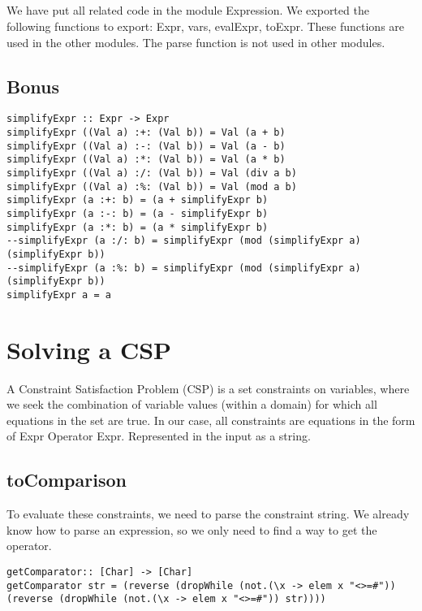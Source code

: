 \documentclass[a4paper,11pt]{article}
\begin{document}
\subsection{}
We have put all related code in the module Expression. We exported the following functions to export: Expr, vars, evalExpr, toExpr. These functions are used in the other modules. The parse function is not used in other modules.

\subsection{Bonus}
\begin{lstlisting}
simplifyExpr :: Expr -> Expr
simplifyExpr ((Val a) :+: (Val b)) = Val (a + b)
simplifyExpr ((Val a) :-: (Val b)) = Val (a - b)
simplifyExpr ((Val a) :*: (Val b)) = Val (a * b)
simplifyExpr ((Val a) :/: (Val b)) = Val (div a b)
simplifyExpr ((Val a) :%: (Val b)) = Val (mod a b)
simplifyExpr (a :+: b) = (a + simplifyExpr b)
simplifyExpr (a :-: b) = (a - simplifyExpr b)
simplifyExpr (a :*: b) = (a * simplifyExpr b)
--simplifyExpr (a :/: b) = simplifyExpr (mod (simplifyExpr a) (simplifyExpr b))
--simplifyExpr (a :%: b) = simplifyExpr (mod (simplifyExpr a) (simplifyExpr b))
simplifyExpr a = a

\end{lstlisting}

\section{Solving a CSP}
 
 A Constraint Satisfaction Problem (CSP) is a set constraints on variables,  
 where we seek the combination of variable values (within a domain) for 
 which all equations in the set are true. In our case, all constraints are 
 equations in the form of Expr Operator Expr. Represented in the input as a 
 string. 
 
 \subsection{toComparison}
 
 To evaluate these constraints, we need to parse the constraint string. We 
 already know how to parse an expression, so we only need to find a way to 
 get the operator.
 \begin{lstlisting}
getComparator:: [Char] -> [Char]
getComparator str = (reverse (dropWhile (not.(\x -> elem x "<>=#")) (reverse (dropWhile (not.(\x -> elem x "<>=#")) str))))
 \end{lstlisting}
 
\end{document}
